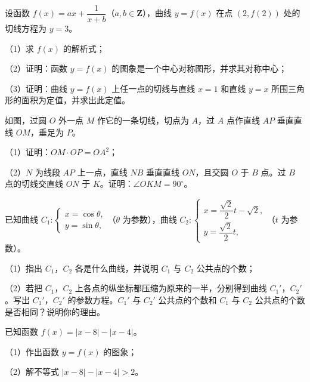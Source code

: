 \begin{question}
设函数 $f(x)=ax+\dfrac1{x+b}$（$a,b\in\mathbf Z$），曲线 $y=f(x)$ 在点 $(2,f(2))$ 处的切线方程为 $y=3$。

（1）求 $f(x)$ 的解析式；

（2）证明：函数 $y=f(x)$ 的图象是一个中心对称图形，并求其对称中心；

（3）证明：曲线 $y=f(x)$ 上任一点的切线与直线 $x=1$ 和直线 $y=x$ 所围三角形的面积为定值，并求出此定值。

\end{question}

\Needspace{0.4\textheight}
\begin{question}
如图，过圆 $O$ 外一点 $M$ 作它的一条切线，切点为 $A$，过 $A$ 点作直线 $AP$ 垂直直线 $OM$，垂足为 $P$。

（1）证明：$OM\cdot OP=OA^2$；

（2）$N$ 为线段 $AP$ 上一点，直线 $NB$ 垂直直线 $ON$，且交圆 $O$ 于 $B$ 点。过 $B$ 点的切线交直线 $ON$ 于 $K$。证明：$\angle OKM=90^\circ$。
\nopagebreak[4]
\begin{center}\end{center}
\nopagebreak[4]
\end{question}
\begin{question}
已知曲线 $C_1:\begin{cases}x=\cos\theta,\\ y=\sin\theta,\end{cases}$（$\theta$ 为参数），曲线 $C_2:\begin{cases}x=\dfrac{\sqrt2}2t-\sqrt2,\\ y=\dfrac{\sqrt2}2t,\end{cases}$（$t$ 为参数）。

（1）指出 $C_1$，$C_2$ 各是什么曲线，并说明 $C_1$ 与 $C_2$ 公共点的个数；

（2）若把 $C_1$，$C_2$ 上各点的纵坐标都压缩为原来的一半，分别得到曲线 $C_1'$，$C_2'$。写出 $C_1'$，$C_2'$ 的参数方程。$C_1'$ 与 $C_2'$ 公共点的个数和 $C_1$ 与 $C_2$ 公共点的个数是否相同？说明你的理由。

\Needspace{0.4\textheight}
\end{question}
\begin{question}
已知函数 $f(x)=|x-8|-|x-4|$。

（1）作出函数 $y=f(x)$ 的图象；

（2）解不等式 $|x-8|-|x-4|>2$。
\nopagebreak[4]
\begin{center}\end{center}
\nopagebreak[4]

\end{question}